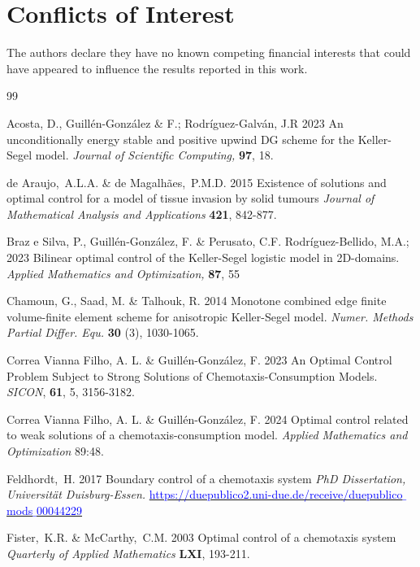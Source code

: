 \documentclass[11pt]{article}
\numberwithin{theorem}{section}
\begin{document}
\section*{Conflicts of Interest}

The authors declare they have no known competing financial interests that could have appeared to influence the results reported in this work.



\begin{thebibliography}{99}

Acosta, D., Guill\'en-Gonz\'alez \& F.; Rodr\'iguez-Galv\'an, J.R
2023
An unconditionally energy stable and positive upwind DG scheme for the Keller-Segel model. 
\textit{Journal of Scientific Computing,} \textbf{97}, 18.

  de Araujo,~A.L.A. \& de Magalhães,~P.M.D. 
2015  
Existence of solutions and optimal control for a model of tissue
invasion by solid tumours
\textit{Journal of Mathematical Analysis and Applications} \textbf{421}, 842-877. 

Braz e Silva, P., Guill\'en-Gonz\'alez, F. \& Perusato, C.F. Rodr\'iguez-Bellido, M.A.; 
2023
Bilinear optimal control of the Keller-Segel logistic model in 2D-domains. 
\textit{Applied Mathematics and Optimization,} 
\textbf{87}, 55

Chamoun, G., Saad, M. \& Talhouk, R. 
2014
Monotone combined edge finite volume-finite element scheme for anisotropic Keller-Segel model. 
\textit{Numer. Methods Partial Differ. Equ.} \textbf{30} (3), 1030-1065.

Correa Vianna Filho, A. L. \& Guill\'en-Gonz\'alez, F.
2023
An Optimal Control Problem Subject to Strong Solutions of Chemotaxis-Consumption Models. 
\textit{SICON}, \textbf{61}, 5, 3156-3182.

Correa Vianna Filho, A. L. \& Guill\'en-Gonz\'alez, F. 
2024 
Optimal control related to weak solutions of a chemotaxis-consumption model.
 \textit{Applied Mathematics and Optimization} 89:48. 

  Feldhordt,~H. 
2017  
Boundary control of a chemotaxis system
\textit{PhD Dissertation, Universität Duisburg-Essen.}
\href{https://duepublico2.uni-due.de/receive/duepublico_mods_00044229}{\textcolor{blue}{https://duepublico2.uni-due.de/receive/duepublico$\_$mods$\_$00044229}}

  Fister,~K.R. \& McCarthy,~C.M. 
2003   
Optimal control of a chemotaxis system
\textit{Quarterly of Applied Mathematics} \textbf{LXI}, 193-211. 


\end{thebibliography}
\end{document}
